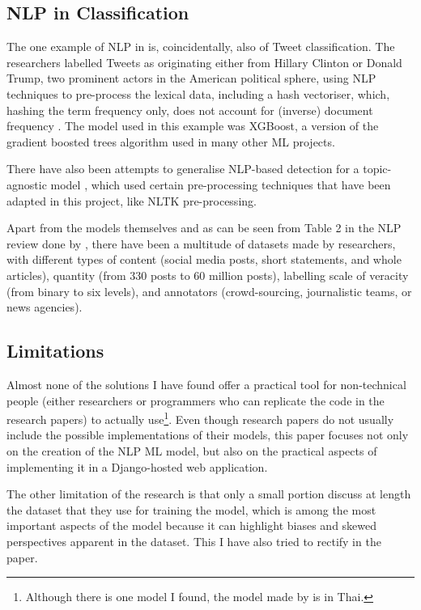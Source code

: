 \documentclass{l4proj}
\begin{document}
\subsection{NLP in Classification}

The one example of NLP in \cite{MLApps} is, coincidentally, also of Tweet classification. The researchers labelled Tweets as originating either from Hillary Clinton or Donald Trump, two prominent actors in the American political sphere, using NLP techniques to pre-process the lexical data, including a hash vectoriser, which, hashing the term frequency only, does not account for (inverse) document frequency \citep{scikit-learn}. The model used in this example was XGBoost, a version of the gradient boosted trees algorithm used in many other ML projects.

There have also been attempts to generalise NLP-based detection for a topic-agnostic model \citep{Topic-AgnosticIdentification}, which used certain pre-processing techniques that have been adapted in this project, like NLTK pre-processing.

Apart from the models themselves and as can be seen from Table 2 in the NLP review done by \cite{FakeNewsTrends}, there have been a multitude of datasets made by researchers, with different types of content (social media posts, short statements, and whole articles), quantity (from 330 posts to 60 million posts), labelling scale of veracity (from binary to six levels), and annotators (crowd-sourcing, journalistic teams, or news agencies). 


\subsection{Limitations}
Almost none of the solutions I have found offer a practical tool for non-technical
people (either researchers or programmers who can replicate the code in the research papers) to actually use\footnote{Although there is one model I found, the model made by \cite{ThaiModel} is in Thai.}. Even though research papers do not usually include the possible implementations of their models, this paper focuses not only on the creation of the NLP ML model, but also on the practical aspects of implementing it in a Django-hosted web application. 

The other limitation of the research is that only a small portion discuss at length the dataset that they use for training the model, which is among the most important aspects of the model because it can highlight biases and skewed perspectives apparent in the dataset. This I have also tried to rectify in the paper.
\end{document}
